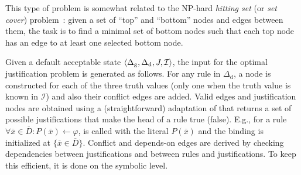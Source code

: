 \documentclass[11pt]{article}
\newcommand{\m}[1]{\ensuremath{#1}\xspace}
\newcommand{\lrule}{\m{\leftarrow}}
\newcommand{\I}{\m{\mathcal{I}}}
\newcommand{\D}{\m{\Delta}}
\newcommand{\f}{\m{\varphi}}
\newcommand{\xxx}{\m{\overline{x}}}
\newcommand{\DDD}{\m{\overline{D}}}
\newcommand{\tuple}[1]{\m{\left \langle #1 \right \rangle }}
\theoremstyle{plain}
\theoremstyle{definition}
\theoremstyle{example_basic}
\theoremstyle{example_contd}
\theoremstyle{plain}
\newcommand{\Dg}{\ensuremath{\D_\text{g}}\xspace}
\newcommand{\Dd}{\ensuremath{\D_\text{d}}\xspace}
\newcommand{\change}[1]{#1}
\begin{document}
This type of problem is somewhat related to the NP-hard \emph{hitting set} (or \emph{set cover}) problem~\cite{Kar72}: given a set of ``top'' and ``bottom'' nodes and edges between them, the task is to find a minimal set of bottom nodes such that each top node has an edge to at least one selected bottom node.

Given a default acceptable state $\tuple{\Dg,\Dd,\jgraph,\I}$, the
input for the optimal justification problem is generated as
follows. For any rule in \Dd, a node is constructed for each of the
three truth values (only one when the truth value is known in \I) and
also their conflict edges are added. \change{ Valid edges and
  justification nodes} are obtained using a (straightforward) adaptation of \buildconstr \change{that} returns a set of possible justifications that make the head of a rule true (false). E.g., for a rule $\forall \xxx \in \DDD: P(\xxx) \lrule \f$, \buildconstr is called with the literal $P(\xxx)$ and the binding is initialized at $\{\xxx \in \DDD\}$. Conflict and depends-on edges are derived by checking dependencies between justifications and between rules and justifications. To keep this efficient, it is done on the symbolic level.
\end{document}
